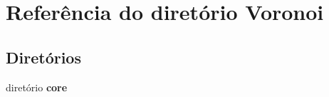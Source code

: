 \section{Referência do diretório Voronoi}
\label{dir_7b4cc60c07e5d77ced3da2be61817122}
\subsection*{Diretórios}
\begin{DoxyCompactItemize}
\item 
diretório {\bf core}
\end{DoxyCompactItemize}
